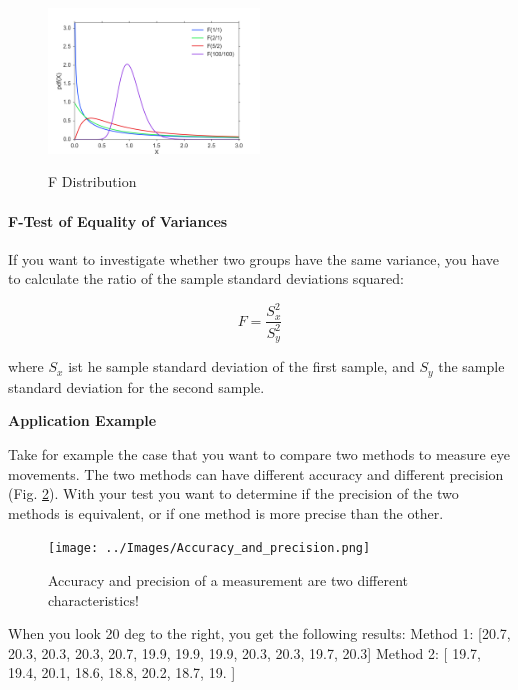 \begin{figure}
  \centering
  \includegraphics[width=0.5\textwidth]{../Images/dist_f.png}\\
  \caption{F Distribution}
  \label{fig:Fdistribution}
\end{figure}


\paragraph{F-Test of Equality of Variances}
If you want to investigate whether two groups have the same variance, you have to calculate the ratio of the sample standard deviations squared:

\begin{equation}
  F = \frac{S_x^2}{S_y^2}
\end{equation}

where $S_x$ ist he sample standard deviation of the first sample, and $S_y$ the sample standard deviation for the second sample.

\textbf{Application Example}

Take for example the case that you want to compare two methods to measure eye movements. The two methods
can have different accuracy and different precision (Fig. \ref{fig:accuracy}). With your test you want to
determine if the precision of the two methods is equivalent, or if one
method is more precise than the other.

\begin{figure}
  \centering
  \texttt{[image: ../Images/Accuracy\_and\_precision.png]}\\
  \caption{Accuracy and precision of a measurement are two different characteristics!}
  \label{fig:accuracy}
\end{figure}

When you look 20 deg to the right, you get the following results:
Method 1: [20.7,  20.3,  20.3,  20.3,  20.7,  19.9,  19.9,  19.9,  20.3,
        20.3,  19.7,  20.3]
Method 2: [ 19.7,  19.4,  20.1,  18.6,  18.8,  20.2,  18.7,  19. ]

